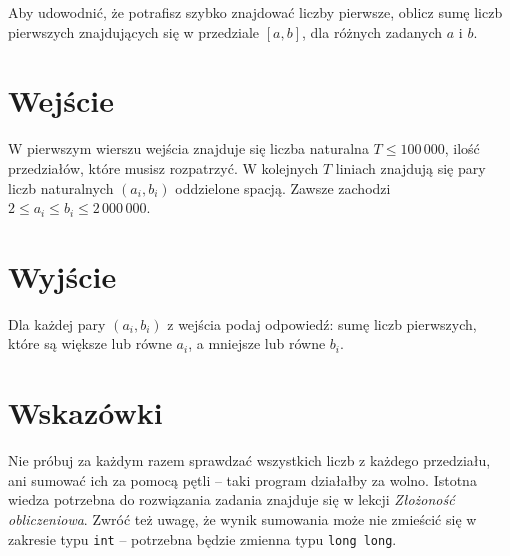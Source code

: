 \documentclass{spiral-kurs}
\begin{document}
\makeheader
%
  
    Aby udowodnić, że potrafisz szybko znajdować liczby pierwsze, oblicz sumę liczb pierwszych znajdujących się w przedziale $[a, b]$, dla różnych zadanych $a$ i $b$.

    \section{Wejście}
    W pierwszym wierszu wejścia znajduje się liczba naturalna $T \leq 100\,000$, ilość przedziałów, które musisz rozpatrzyć. W kolejnych $T$ liniach znajdują się
    pary liczb naturalnych $(a_i, b_i)$ oddzielone spacją. Zawsze zachodzi $2 \leq a_i \leq b_i \leq 2\,000\,000$.
      
    \section{Wyjście}

    Dla każdej pary $(a_i, b_i)$ z wejścia podaj odpowiedź: sumę liczb pierwszych, które są większe lub równe $a_i$, a mniejsze lub równe $b_i$.

    
    \section{Wskazówki}
    Nie próbuj za każdym razem sprawdzać wszystkich liczb z każdego przedziału, ani sumować ich za pomocą pętli -- taki program działałby za wolno.
    Istotna wiedza potrzebna do rozwiązania zadania znajduje się w lekcji {\it Złożoność obliczeniowa}. Zwróć też uwagę, że wynik sumowania może nie zmieścić się
    w zakresie typu {\tt int} -- potrzebna będzie zmienna typu {\tt long long}.

  
\end{document}

